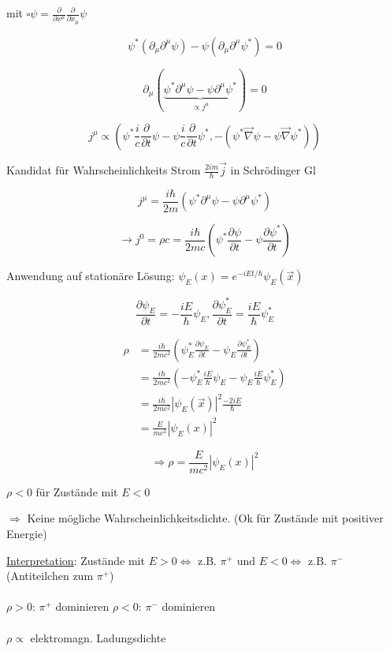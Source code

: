 mit \(\square \psi = \frac{\partial}{\partial x^\mu} \frac{\partial}{\partial x_\mu} \psi\)


\[\psi^*(\partial_\mu\partial^\mu \psi) - \psi(\partial_\mu\partial^\mu \psi^*) = 0 \]

\[\partial_\mu(\underbrace{\psi^*\partial^\mu\psi - \psi \partial^\mu \psi^*}_{\propto j^\mu}) = 0\]

\[ j^\mu \propto (\psi^*\frac{i}{c}\frac{\partial}{\partial t}\psi - \psi\frac{i}{c}\frac{\partial}{\partial t}\psi^* ,-(\psi^*\vec \nabla \psi - \psi\vec \nabla\psi^*)) \]

Kandidat für Wahrscheinlichkeits Strom \(\frac{2im}{\hbar}\vec j\) in Schrödinger Gl

\[j^\mu = \frac{i\hbar}{2m} (\psi^*\partial^\mu \psi - \psi \partial^\mu \psi^*)\]

\[\rightarrow j^0 = \rho c =  \frac{i\hbar}{2mc}(\psi^*\frac{\partial\psi}{\partial t} - \psi\frac{\partial\psi^*}{\partial t}) \]

Anwendung auf stationäre Lösung: \(\psi_E(x) = e^{-iEt/\hbar}\psi_E(\vec x)\)

\[\frac{\partial \psi_E}{\partial t} = -\frac{iE}{\hbar}\psi_E,\frac{\partial \psi_E^*}{\partial t} = \frac{iE}{\hbar}\psi_E^*\]

\begin{align}
\rho &=  \frac{i\hbar}{2mc^2}(\psi^*_E\frac{\partial\psi_E}{\partial t} - \psi_E\frac{\partial\psi^*_E}{\partial t}) \\
&=  \frac{i\hbar}{2mc^2}(-\psi^*_E\frac{iE}{\hbar}\psi_E  - \psi_E \frac{iE}{\hbar}\psi_E^*) \\
&= \frac{i\hbar}{2mc^2}|\psi_E(\vec x)|^2\frac{-2iE}{\hbar}\\
&= \frac{E}{mc^2}|\psi_E(x)|^2
\end{align}

\[ \Rightarrow \boxed{ \rho = \frac{E}{mc^2}|\psi_E(x)|^2} \]

\(\rho < 0\) für Zustände mit \(E<0\)

\(\Rightarrow  \) Keine mögliche Wahrscheinlichkeitsdichte. (Ok für Zustände mit positiver Energie)


\underline{Interpretation}: Zustände mit \(E>0\Leftrightarrow \) z.B. \(\pi^+\) und  \(E<0\Leftrightarrow \) z.B. \(\pi^-\)(Antiteilchen zum  \(\pi^+\))\\
\\
\(\rho > 0\): \(\pi^+\) dominieren
\(\rho < 0\): \(\pi^-\) dominieren\\
\\
\(\rho \propto\) elektromagn. Ladungsdichte

